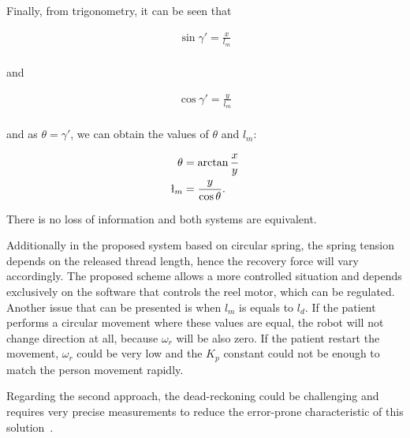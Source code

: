 \documentclass[journal]{IEEEtran}
\begin{document}
Finally, from trigonometry, it can be seen that

\begin{align*}
\sin{\gamma'} = \frac{x}{l_m}\\
\end{align*}

and 

\begin{align*}
\cos{\gamma'} = \frac{y}{l_m}\\
\end{align*}

\noindent and as $\theta = \gamma'$, we can obtain the values of $\theta$ and $l_m$:

\begin{align*}
\theta &= \arctan{ \frac{x}{y}} \\
\l_m    &= \frac{y}{\cos{\theta}}. \\
\end{align*}

There is no loss of information and both systems are equivalent.

Additionally in the proposed system based on circular spring, the spring tension depends on the released thread length, hence the recovery force will vary accordingly.   The proposed scheme allows a more controlled situation and depends exclusively on the software that controls the reel motor, which can be regulated.
Another issue that can be presented is when $l_m$ is equals to $l_d$.  If the patient performs a circular movement where these values are equal, the robot will not change direction at all, because $\omega_{r}$ will be also zero.   If the patient restart the movement, $\omega_{r}$ could be very low and the $K_p$ constant could not be enough to match the person movement rapidly.

Regarding the second approach, the dead-reckoning could be challenging and requires very precise measurements to reduce the error-prone characteristic of this solution~\cite{DurrantWhyte1994}.

\end{document}
